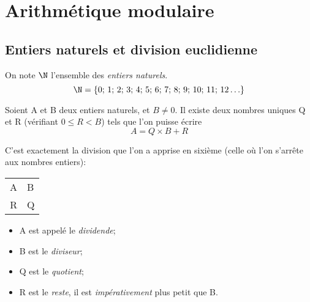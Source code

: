 \newcommand{\tabstrut}{\vrule height 1.25em depth 0.5em width 0pt}
\chapter{Arithmétique modulaire}

\section{Entiers naturels et division euclidienne}

\begin{definition}
	On note $\N$ l'ensemble des \textit{entiers naturels}. $$\N=\lbrace 0;\,1;\,2;\,3;\,4;\,5;\,6;\,7;\,8;\,9;\,10;\,11;\,12\ldots\rbrace$$
\end{definition}

\begin{definition}
	
	Soient A et B deux entiers naturels, et $B\neq 0$. Il existe deux nombres uniques Q et R (vérifiant $0\leqslant R<B$) tels que l'on puisse écrire
	$$A = Q\times B + R$$
	
	C'est exactement la division que l'on a apprise en sixième (celle où l'on s'arrête aux nombres entiers):
	\begin{center}

		\begin{tabular}{r|l}
			A & B \\
			\cline{2-2}
			R & Q
		\end{tabular}
		
	\end{center}
	\begin{itemize}
		\item 	A est appelé le \textit{dividende};
		\item 	B est le \textit{diviseur};
		\item	Q est le \textit{quotient};
		\item 	R est le \textit{reste}, il est \textit{impérativement} plus petit que B.
	\end{itemize}
	
\end{definition}

